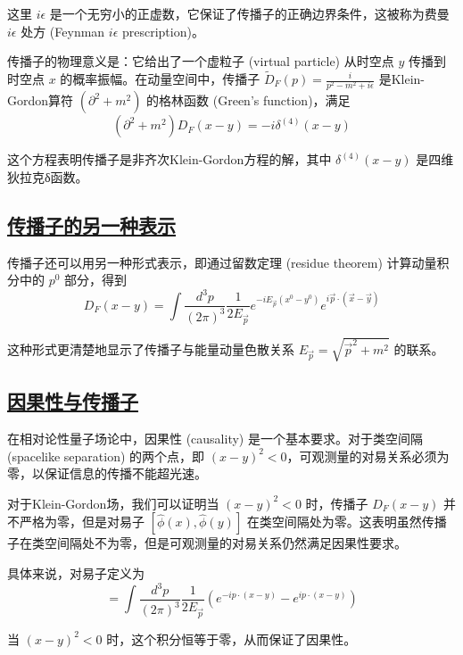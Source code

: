 这里 $i\epsilon$ 是一个无穷小的正虚数，它保证了传播子的正确边界条件，这被称为费曼 $i\epsilon$ 处方 (Feynman $i\epsilon$ prescription)。

传播子的物理意义是：它给出了一个虚粒子 (virtual particle) 从时空点 $y$ 传播到时空点 $x$ 的概率振幅。在动量空间中，传播子 $\tilde{D}_F(p) = \frac{i}{p^2 - m^2 + i\epsilon}$ 是Klein-Gordon算符 $(\partial^2 + m^2)$ 的格林函数 (Green's function)，满足
\begin{equation*}
    (\partial^2 + m^2) D_F(x-y) = -i\delta^{(4)}(x-y)
\end{equation*}

这个方程表明传播子是非齐次Klein-Gordon方程的解，其中 $\delta^{(4)}(x-y)$ 是四维狄拉克δ函数。

\subsection{\protect\hyperlink{:}{传播子的另一种表示}}

传播子还可以用另一种形式表示，即通过留数定理 (residue theorem) 计算动量积分中的 $p^0$ 部分，得到
\begin{equation*}
    D_F(x-y) = \int \frac{d^3p}{(2\pi)^3} \frac{1}{2E_{\vec{p}}} e^{-iE_{\vec{p}}(x^0-y^0)} e^{i\vec{p}\cdot(\vec{x}-\vec{y})}
\end{equation*}

这种形式更清楚地显示了传播子与能量动量色散关系 $E_{\vec{p}} = \sqrt{\vec{p}^2 + m^2}$ 的联系。

\subsection{\protect\hyperlink{:}{因果性与传播子}}

在相对论性量子场论中，因果性 (causality) 是一个基本要求。对于类空间隔 (spacelike separation) 的两个点，即 $(x-y)^2 < 0$，可观测量的对易关系必须为零，以保证信息的传播不能超光速。

对于Klein-Gordon场，我们可以证明当 $(x-y)^2 < 0$ 时，传播子 $D_F(x-y)$ 并不严格为零，但是对易子 $[\hat{\phi}(x), \hat{\phi}(y)]$ 在类空间隔处为零。这表明虽然传播子在类空间隔处不为零，但是可观测量的对易关系仍然满足因果性要求。

具体来说，对易子定义为
\begin{equation*}
    [\hat{\phi}(x), \hat{\phi}(y)] = \int \frac{d^3p}{(2\pi)^3} \frac{1}{2E_{\vec{p}}} \left(e^{-ip\cdot(x-y)} - e^{ip\cdot(x-y)}\right)
\end{equation*}

当 $(x-y)^2 < 0$ 时，这个积分恒等于零，从而保证了因果性。
